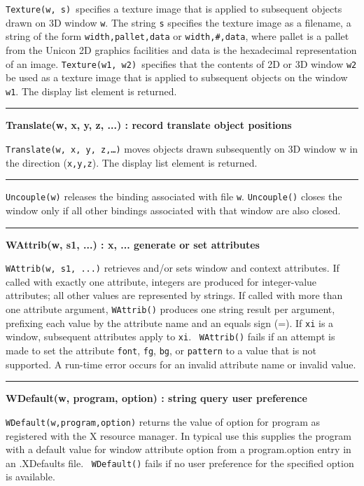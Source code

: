 \noindent
\texttt{Texture(w, s) }specifies a texture image that is applied to
subsequent objects drawn on 3D window \texttt{w}. The string \texttt{s}
specifies the texture image as a filename, a string of the form
\texttt{width,pallet,data} or \texttt{width,\#,data}, where pallet is a
pallet from the Unicon 2D graphics facilities and data is the
hexadecimal representation of an image. \texttt{Texture(w1, w2)
}specifies that the contents of 2D or 3D window \texttt{w2} be used as
a texture image that is applied to subsequent objects on the window
\texttt{w1}. The display list element is returned.

\bigskip\hrule\vspace{0.1cm}
\noindent
{\bf Translate(w, x, y, z, ...) : record \hfill translate object positions}

\noindent
\texttt{Translate(w, x, y, z,{\dots})} moves objects drawn subsequently
on 3D window w in the direction (\texttt{x,y,z}). The display list
element is returned.

\bigskip\hrule\vspace{0.1cm}

\noindent
\texttt{Uncouple(w)} releases the binding associated with file
\texttt{w}. \texttt{Uncouple()} closes the window only if all other
bindings associated with that window are also closed.

\bigskip\hrule\vspace{0.1cm}
\noindent
{\bf WAttrib(w, s1, ...) : x, ... \hfill generate or set attributes}

\noindent
\texttt{WAttrib(w, s1, ...)} retrieves and/or sets window and context
attributes. If called with exactly one attribute, integers are produced
for integer-value attributes; all other values are represented by
strings. If called with more than one attribute argument,
\texttt{WAttrib()} produces one string result per argument, prefixing
each value by the attribute name and an equals sign (=). If
\texttt{xi} is a window, subsequent attributes apply to \texttt{xi}.
\ \texttt{WAttrib()} fails if an attempt is made to set the attribute
\texttt{font}, \texttt{fg}, \texttt{bg}, or \texttt{pattern} to a value
that is not supported. A run-time error occurs for an invalid attribute
name or invalid value.

\bigskip\hrule\vspace{0.1cm}
\noindent
{\bf WDefault(w, program, option) : string \hfill query user preference}

\noindent
\texttt{WDefault(w,program,option)} returns the value of option for
program as registered with the X resource manager. In typical use this
supplies the program with a default value for window attribute option
from a program.option entry in an .XDefaults file.
\ \texttt{WDefault()} fails if no user preference for the specified
option is available.

